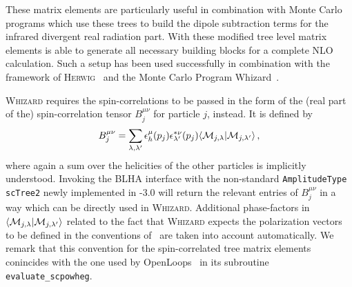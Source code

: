 These matrix elements are particularly useful in combination with Monte Carlo programs which use these trees to build the dipole subtraction terms for the infrared divergent real radiation part. With these modified tree level matrix elements \gosam{} is able to generate
all necessary building blocks for a complete NLO calculation. Such a setup has been used successfully in combination with the framework of
\textsc{Herwig}~\cite{LesHouches2013,Bellm:2013lba,Platzer:2011bc} and the Monte Carlo Program Whizard~\cite{Kilian:2007gr,Moretti:2001zz,Stienemeier:2021cse,Braun:2025hvr}.

\textsc{Whizard} requires the spin-correlations to be passed in the form of the (real  part of the) spin-correlation tensor $B_j^{\mu\nu}$ for particle $j$, instead. It is defined by
\begin{equation}
   B_j^{\mu\nu} = \sum_{\lambda,\lambda'}\epsilon_h^\mu(p_j)\epsilon_{\lambda'}^{*\nu}(p_j)\langle {\cal M}_{j,\lambda}|{\cal M}_{j,\lambda'}\rangle\,,
\end{equation}
where again a sum over the helicities of the other particles is implicitly understood. Invoking the BLHA interface with the non-standard \texttt{AmplitudeType scTree2} newly implemented in \gosam{}-3.0 will return the relevant entries of $B_j^{\mu\nu}$ in a way which can be directly used in \textsc{Whizard}. Additional phase-factors in $\langle {\cal M}_{j,\lambda}|{\cal M}_{j,\lambda'}\rangle$ related to the fact that \textsc{Whizard} expects the polarization vectors to be defined in the conventions of~\cite{Murayama:1992gi} are taken into account automatically. We remark that this convention for the spin-correlated tree matrix elements conincides with the one used by OpenLoops~\cite{Buccioni:2019sur} in its subroutine \texttt{evaluate\_scpowheg}.


